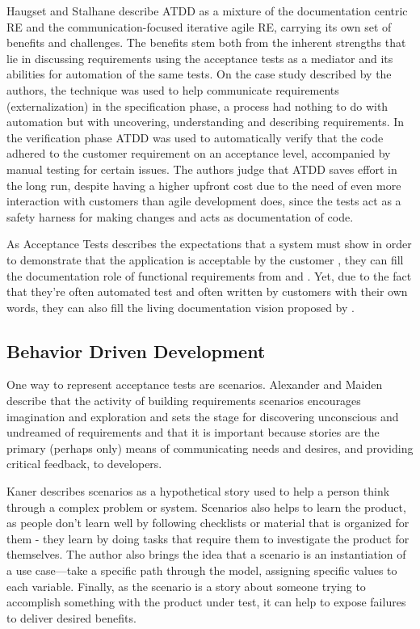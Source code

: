 Haugset and Stalhane \cite{Haugset_2012} describe ATDD as a mixture of the documentation centric RE and the communication-focused iterative agile RE, carrying its own set of benefits and challenges. The benefits stem both from the inherent strengths that lie in discussing requirements using the acceptance tests as a mediator and its abilities for automation of the same tests. On the case study described by the authors, the technique was used to help communicate requirements (externalization) in the specification phase, a process had nothing to do with automation but with uncovering, understanding and describing requirements. In the verification phase ATDD was used to automatically verify that the code adhered to the customer requirement on an acceptance level, accompanied by manual testing for certain issues. The authors judge that ATDD saves effort in the long run, despite having a higher upfront cost due to the need of even more interaction with customers than agile development does, since the tests act as a safety harness for making changes and acts as documentation of code.

As Acceptance Tests describes the expectations that a system must show in order to demonstrate that the application is acceptable by the customer \cite{Cohn_2004}, they can fill the documentation role of functional requirements from \cite{Babok_2009} and \cite{Babok_2015}. Yet, due to the fact that they're often automated test and often written by customers with their own words, they can also fill the living documentation vision proposed by \cite{Adzic_2011}.

\subsection{Behavior Driven Development}

One way to represent acceptance tests are scenarios. Alexander and Maiden \cite{Alexander_2004} describe that the activity of building requirements scenarios encourages imagination and exploration and sets the stage for discovering unconscious and undreamed of requirements and that it is important because stories are the primary
(perhaps only) means of communicating needs and desires, and providing critical feedback, to developers.

Kaner \cite{Kaner_2003} describes scenarios as a hypothetical story used to help a person think through a complex problem or system. Scenarios also helps to learn the product, as people don’t learn well by following checklists or material that is organized for them - they learn by doing tasks that require them to investigate the product for themselves. The author also brings the idea that a scenario is an instantiation of a use case—take a specific path through the model, assigning specific values to each variable. Finally, as the scenario is a story about someone trying to accomplish something with the product under test, it can help to expose failures to deliver desired benefits.

